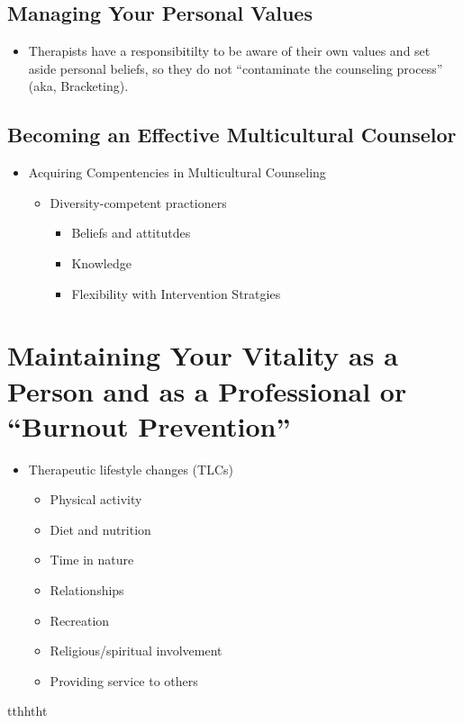 \subsection{Managing Your Personal Values}

\begin{itemize}
    \item Therapists have a responsibitilty to be aware of their own values and set aside  personal beliefs, so they do not ``contaminate the counseling process'' (aka, Bracketing). 
\end{itemize}

\subsection{Becoming an Effective Multicultural Counselor} 

\begin{itemize}
    \item Acquiring Compentencies in Multicultural Counseling
    \begin{itemize}
        \item Diversity-competent practioners
        \begin{itemize}
            \item Beliefs and attitutdes
            \item Knowledge
            \item Flexibility with Intervention Stratgies
        \end{itemize}
    \end{itemize}
\end{itemize}

\section{Maintaining Your Vitality as a Person and as a Professional or ``Burnout Prevention''}

\begin{itemize}
    \item Therapeutic lifestyle changes (TLCs)
    \begin{itemize}
        \item Physical activity
        \item Diet and nutrition
        \item Time in nature
        \item Relationships
        \item Recreation
        \item Religious/spiritual involvement
        \item Providing service to others
    \end{itemize}
\end{itemize}

tthhtht